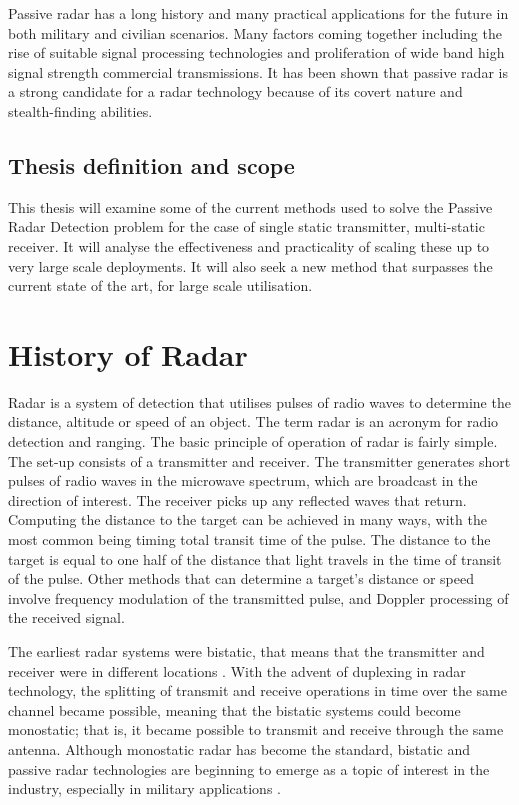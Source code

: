 \documentclass[12pt,openany,a4paper]{book}
\begin{document}
\bigskip

Passive radar has a long history and many practical applications for the future in both military and civilian scenarios. Many factors coming together including the rise of suitable signal processing technologies and proliferation of wide band high signal strength commercial transmissions. It has been shown that passive radar is a strong candidate for a radar technology because of its covert nature and stealth-finding abilities. 


\section{Thesis definition and scope}
This thesis will examine some of the current methods used to solve the Passive Radar Detection problem for the case of single static transmitter, multi-static receiver. It will analyse the effectiveness and practicality of scaling these up to very large scale deployments. It will also seek a new method that surpasses the current state of the art, for large scale utilisation.


\cleardoublepage

\chapter{History of Radar}

Radar is a system of detection that utilises pulses of radio waves to determine the distance, altitude or speed of an object. The term radar is an acronym for radio detection and ranging. The basic principle of operation of radar is fairly simple. The set-up consists of a transmitter and receiver. The transmitter generates short pulses of radio waves in the microwave spectrum, which are broadcast in the direction of interest. The receiver picks up any reflected waves that return. Computing the distance to the target can be achieved in many ways, with the most common being timing total transit time of the pulse. The distance to the target is equal to one half of the distance that light travels in the time of transit of the pulse. Other methods that can determine a target's distance or speed involve frequency modulation of the transmitted pulse, and Doppler processing of the received signal.

\bigskip

The earliest radar systems were bistatic, that means that the transmitter and receiver were in different locations \cite{Willis}. With the advent of duplexing in radar technology, the splitting of transmit and receive operations in time over the same channel became possible, meaning that the bistatic systems could become monostatic; that is, it became possible to transmit and receive through the same antenna. Although monostatic radar has become the standard, bistatic and passive radar technologies are beginning to emerge as a topic of interest in the industry, especially in military applications \cite{Arend}. 
\end{document}
